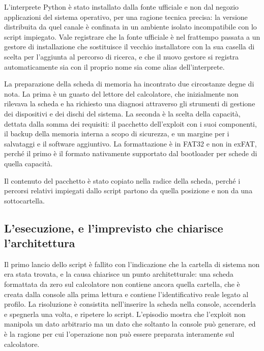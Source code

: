 L'interprete Python è stato installato dalla fonte ufficiale e non dal negozio applicazioni del sistema operativo, per una ragione tecnica precisa: la versione distribuita da quel canale è confinata in un ambiente isolato incompatibile con lo script impiegato. Vale registrare che la fonte ufficiale è nel frattempo passata a un gestore di installazione che sostituisce il vecchio installatore con la sua casella di scelta per l'aggiunta al percorso di ricerca, e che il nuovo gestore si registra automaticamente sia con il proprio nome sia come alias dell'interprete.

La preparazione della scheda di memoria ha incontrato due circostanze degne di nota. La prima è un guasto del lettore del calcolatore, che inizialmente non rilevava la scheda e ha richiesto una diagnosi attraverso gli strumenti di gestione dei dispositivi e dei dischi del sistema. La seconda è la scelta della capacità, dettata dalla somma dei requisiti: il pacchetto dell'exploit con i suoi componenti, il backup della memoria interna a scopo di sicurezza, e un margine per i salvataggi e il software aggiuntivo. La formattazione è in FAT32 e non in exFAT, perché il primo è il formato nativamente supportato dal bootloader per schede di quella capacità.

Il contenuto del pacchetto è stato copiato nella radice della scheda, perché i percorsi relativi impiegati dallo script partono da quella posizione e non da una sottocartella.

\subsection{L'esecuzione, e l'imprevisto che chiarisce l'architettura}

Il primo lancio dello script è fallito con l'indicazione che la cartella di sistema non era stata trovata, e la causa chiarisce un punto architetturale: una scheda formattata da zero sul calcolatore non contiene ancora quella cartella, che è creata dalla console alla prima lettura e contiene l'identificativo reale legato al profilo. La risoluzione è consistita nell'inserire la scheda nella console, accenderla e spegnerla una volta, e ripetere lo script. L'episodio mostra che l'exploit non manipola un dato arbitrario ma un dato che soltanto la console può generare, ed è la ragione per cui l'operazione non può essere preparata interamente sul calcolatore.

